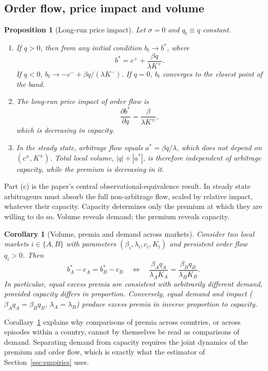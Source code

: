 \documentclass[12pt]{article}
\newtheorem{proposition}{Proposition}
\newtheorem{corollary}{Corollary}
\theoremstyle{definition}
\theoremstyle{remark}
\begin{document}
\subsection{Order flow, price impact and volume}

\begin{proposition}[Long-run price impact]\label{prop:impact}
Let $\sigma=0$ and $q_t\equiv q$ constant.
\begin{enumerate}[label=(\alph*)]
\item If $q>0$, then from any initial condition $b_t\to b^*$, where
\[
b^* = c^+ + \frac{\beta q}{\lambda K^+}.
\]
If $q<0$, $b_t\to -c^- + \beta q/(\lambda K^-)$. If $q=0$, $b_t$ converges to the closest point of the band.
\item The long-run price impact of order flow is
\[
\frac{\partial b^*}{\partial q} = \frac{\beta}{\lambda K^\pm},
\]
which is decreasing in capacity.
\item In the steady state, arbitrage flow equals $a^* = \beta q/\lambda$, which does not depend on $(c^\pm,K^\pm)$. Total local volume, $|q|+|a^*|$, is therefore independent of arbitrage capacity, while the premium is decreasing in it.
\end{enumerate}
\end{proposition}

Part (c) is the paper's central observational-equivalence result. In steady state arbitrageurs must absorb the full non-arbitrage flow, scaled by relative impact, whatever their capacity. Capacity determines only the premium at which they are willing to do so. Volume reveals demand; the premium reveals capacity.

\begin{corollary}[Volume, premia and demand across markets]\label{cor:equivalence}
Consider two local markets $i\in\{A,B\}$ with parameters $(\beta_i,\lambda_i,c_i,K_i)$ and persistent order flow $q_i>0$. Then
\[
b^*_A - c_A = b^*_B - c_B
\quad\Longleftrightarrow\quad
\frac{\beta_A q_A}{\lambda_A K_A} = \frac{\beta_B q_B}{\lambda_B K_B}.
\]
In particular, equal excess premia are consistent with arbitrarily different demand, provided capacity differs in proportion. Conversely, equal demand and impact ($\beta_Aq_A=\beta_Bq_B$, $\lambda_A=\lambda_B$) produce excess premia in inverse proportion to capacity.
\end{corollary}

Corollary~\ref{cor:equivalence} explains why comparisons of premia across countries, or across episodes within a country, cannot by themselves be read as comparisons of demand. Separating demand from capacity requires the joint dynamics of the premium and order flow, which is exactly what the estimator of Section~\ref{sec:empirics} uses.
\end{document}
